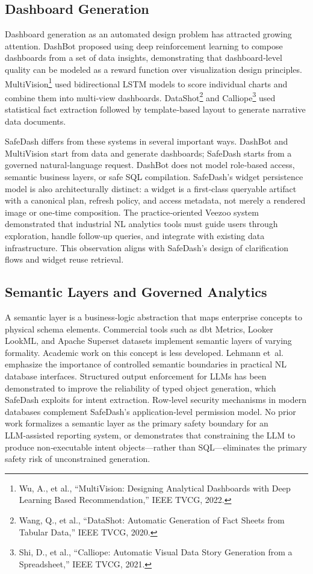 \documentclass[11pt]{article}
\begin{document}
\subsection{Dashboard Generation}
Dashboard generation as an automated design problem has attracted growing attention. DashBot\cite{deng2023dashbot} proposed using deep reinforcement learning to compose dashboards from a set of data insights, demonstrating that dashboard‑level quality can be modeled as a reward function over visualization design principles. MultiVision\footnote{Wu, A., et al., ``MultiVision: Designing Analytical Dashboards with Deep Learning Based Recommendation,'' IEEE TVCG, 2022.} used bidirectional LSTM models to score individual charts and combine them into multi‑view dashboards. DataShot\footnote{Wang, Q., et al., ``DataShot: Automatic Generation of Fact Sheets from Tabular Data,'' IEEE TVCG, 2020.} and Calliope\footnote{Shi, D., et al., ``Calliope: Automatic Visual Data Story Generation from a Spreadsheet,'' IEEE TVCG, 2021.} used statistical fact extraction followed by template‑based layout to generate narrative data documents.

SafeDash differs from these systems in several important ways. DashBot and MultiVision start from data and generate dashboards; SafeDash starts from a governed natural‑language request. DashBot does not model role‑based access, semantic business layers, or safe SQL compilation. SafeDash's widget persistence model is also architecturally distinct: a widget is a first‑class queryable artifact with a canonical plan, refresh policy, and access metadata, not merely a rendered image or one‑time composition. The practice‑oriented Veezoo system~\cite{lehmann2022building} demonstrated that industrial NL analytics tools must guide users through exploration, handle follow‑up queries, and integrate with existing data infrastructure. This observation aligns with SafeDash's design of clarification flows and widget reuse retrieval.

\subsection{Semantic Layers and Governed Analytics}
A semantic layer is a business‑logic abstraction that maps enterprise concepts to physical schema elements. Commercial tools such as dbt Metrics, Looker LookML, and Apache Superset datasets implement semantic layers of varying formality. Academic work on this concept is less developed. Lehmann et~al.~\cite{lehmann2022building} emphasize the importance of controlled semantic boundaries in practical NL database interfaces. Structured output enforcement for LLMs\cite{openai2024structured} has been demonstrated to improve the reliability of typed object generation, which SafeDash exploits for intent extraction. Row‑level security mechanisms in modern databases\cite{postgresql} complement SafeDash's application‑level permission model. No prior work formalizes a semantic layer as the primary safety boundary for an LLM‑assisted reporting system, or demonstrates that constraining the LLM to produce non‑executable intent objects—rather than SQL—eliminates the primary safety risk of unconstrained generation.
\end{document}
